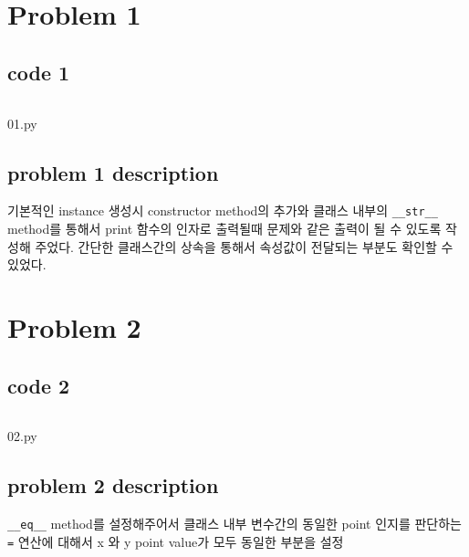 \vspace{-2mm}
\section*{Problem 1}
\vspace{-2mm}
    \subsection*{code 1}
        \begin{listing}[h!]
        \inputminted[framerule = 1pt,framesep = 2mm , frame = lines, fontsize=\footnotesize]{python}{./code/report_03/01.py}
        \vspace{-3mm}
        \caption{01.py}
        \end{listing}
    \vspace{-5mm}
    
    \subsection*{problem 1 description}
    기본적인 instance 생성시 constructor method의 추가와 클래스 내부의 \texttt{__str__} method를 통해서 print 함수의 인자로 출력될때 문제와 같은 출력이 될 수 있도록 작성해 주었다.
    간단한 클래스간의 상속을 통해서 속성값이 전달되는 부분도 확인할 수 있었다.
\vspace{-2mm}
\section*{Problem 2}
\vspace{-2mm}
    \subsection*{code 2}
        \begin{listing}[h!]
        \inputminted[framerule = 1pt,framesep = 2mm , frame = lines, fontsize=\footnotesize]{python}{./code/report_03/02.py}
        \vspace{-3mm}
        \caption{02.py}
        \end{listing}
    \vspace{-5mm}
\clearpage
    \subsection*{problem 2 description}
    \texttt{__eq__} method를 설정해주어서 클래스 내부 변수간의 동일한 point 인지를 판단하는 \texttt{=} 연산에 대해서 x 와 y point value가 모두 동일한 부분을 설정
\vspace{-2mm}
